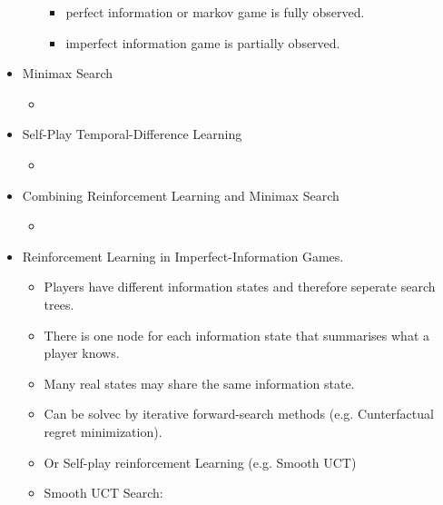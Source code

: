 \begin{itemize}[noitemsep,nolistsep]
\begin{itemize}
		\begin{itemize}[noitemsep,nolistsep]
			\item perfect information or markov game is fully observed.
			\item imperfect information game is partially observed.
		\end{itemize}
	\end{itemize}
	\item Minimax Search
	\begin{itemize}[noitemsep,nolistsep]
		\item 
	\end{itemize}
	\item Self-Play Temporal-Difference Learning
	\begin{itemize}[noitemsep,nolistsep]
		\item 
	\end{itemize}
	\item Combining Reinforcement Learning and Minimax Search
	\begin{itemize}[noitemsep,nolistsep]
		\item 
	\end{itemize}
	\item Reinforcement Learning in Imperfect-Information Games.
	\begin{itemize}[noitemsep,nolistsep]
		\item Players have different information states and therefore seperate search trees.
		\item There is one node for each information state that summarises what a player knows.
		\item Many real states may share the same information state.
		\item Can be solvec by iterative forward-search methods (e.g. Cunterfactual regret minimization).
		\item Or Self-play reinforcement Learning (e.g. Smooth UCT)
		\item Smooth UCT Search:
	\end{itemize}
\end{itemize}

